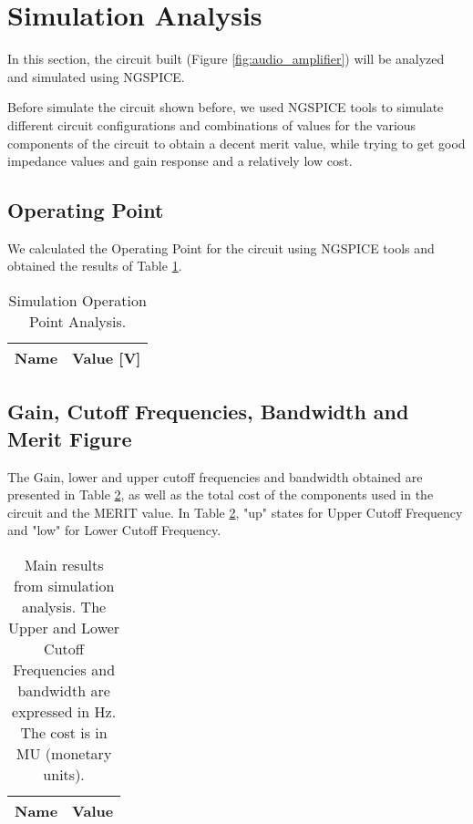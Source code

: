 \newpage
{}
\section{Simulation Analysis}
\label{sec:simulation}

In this section, the circuit built (Figure \ref{fig:audio_amplifier}) will be analyzed and simulated using NGSPICE. 

Before simulate the circuit shown before, we used NGSPICE tools to simulate different circuit configurations and combinations of values for the various components of the circuit to obtain a decent merit value, while trying to get good impedance values and gain response and a relatively low cost. \par


\subsection{Operating Point}

We calculated the Operating Point for the circuit using NGSPICE tools and obtained the results of Table \ref{tab:sim_op}.

\begin{table}[H]
	\centering
	\begin{tabular}{|l|r|}
		\hline    
		{\bf Name } & {\bf Value [V]} \\ \hline
		
	\end{tabular}
	\caption{Simulation Operation Point Analysis.}
	\label{tab:sim_op}
\end{table}


\subsection{Gain, Cutoff Frequencies, Bandwidth and Merit Figure}

The Gain, lower and upper cutoff frequencies and bandwidth obtained are presented in Table \ref{tab:sim_results}, as well as the total cost of the components used in the circuit and the MERIT value. In Table \ref{tab:sim_results}, "up" states for Upper Cutoff Frequency and "low" for Lower Cutoff Frequency.

\begin{table}[H]
	\centering
	\begin{tabular}{|l|r|}
		\hline    
		{\bf Name} & {\bf Value} \\ \hline
		
	\end{tabular}
	\caption{Main results from simulation analysis. The Upper and Lower Cutoff Frequencies and bandwidth are expressed in Hz. The cost is in MU (monetary units).}
	\label{tab:sim_results}
\end{table}

